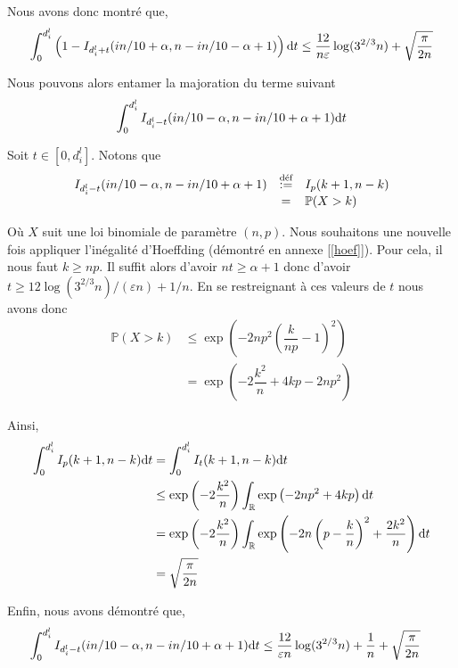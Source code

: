 Nous avons donc montré que,
\begin{align}
    \int_{0}^{d_i^l}\left( 1 - I_{d_i^l + t}(in/10 + \alpha, n - in/10 -  \alpha + 1) \right) \mathrm{d} t \leq \dfrac{12}{n\varepsilon}\log(3^{2/3}n) + \sqrt{\dfrac{\pi}{2n}}
\end{align}

Nous pouvons alors entamer la majoration du terme suivant 
\[
    \int_{0}^{d_i^l}I_{d_i^l - t}(in/10 - \alpha, n - in/10 +  \alpha + 1) \mathrm{d} t    
\]

Soit \(t \in [0, d_i^l]\). Notons que 
\[
    \begin{array}[]{rcl}
        I_{d_i^l - t}(in/10 - \alpha, n - in/10 +  \alpha + 1) & \overset{\text{déf}}{:=} & I_{p}(k+1, n - k)\\
        & = & \mathbb P(X > k)
    \end{array}    
\]

Où \(X\) suit une loi binomiale de paramètre \((n,p)\). Nous souhaitons une nouvelle fois appliquer l'inégalité d'{\sc Hoeffding} (démontré en annexe [\ref{hoef}]). Pour cela, il nous faut \(k \geq np\). Il suffit alors d'avoir \(nt \geq \alpha + 1\) donc d'avoir \(t \geq 12\log(3^{2/3}n)/(\varepsilon n) + 1/n\). En se restreignant à ces valeurs de \(t\) nous avons donc 
\begin{align*}
    \mathbb P(X > k) & \leq \exp\left( -2np^2\left( \dfrac{k}{np} - 1 \right)^2 \right)\\
    & = \exp\left(  -2\dfrac{k^2}{n} +4kp  - 2np^2  \right)
\end{align*}

Ainsi,
\begin{align*}
    \int_0^{d_i^l} I_{p}(k+1, n - k) \mathrm{d} t & = \int_{0}^{d_i^l} I_{t}(k+1, n - k) \mathrm{d} t \\
    & \leq \exp\left( -2\dfrac{k^2}{n} \right) \int_{\mathbb{R}} \exp\left( -2np^2 + 4kp \right)\mathrm{d} t\\
    & = \exp\left( -2\dfrac{k^2}{n} \right) \int_{\mathbb{R}} \exp\left( -2n\left( p - \dfrac{k}{n} \right)^2 + \dfrac{2k^2}{n} \right)\mathrm{d} t\\
    & = \sqrt{\dfrac{\pi}{2n}}
\end{align*}

Enfin, nous avons démontré que,
\begin{align}
    \int_{0}^{d_i^l}I_{d_i^l - t}(in/10 - \alpha, n - in/10 +  \alpha + 1) \mathrm{d} t & \leq \dfrac{12}{\varepsilon n}\log(3^{2/3}n) + \dfrac{1}{n} + \sqrt{\dfrac{\pi}{2n}}
\end{align}

